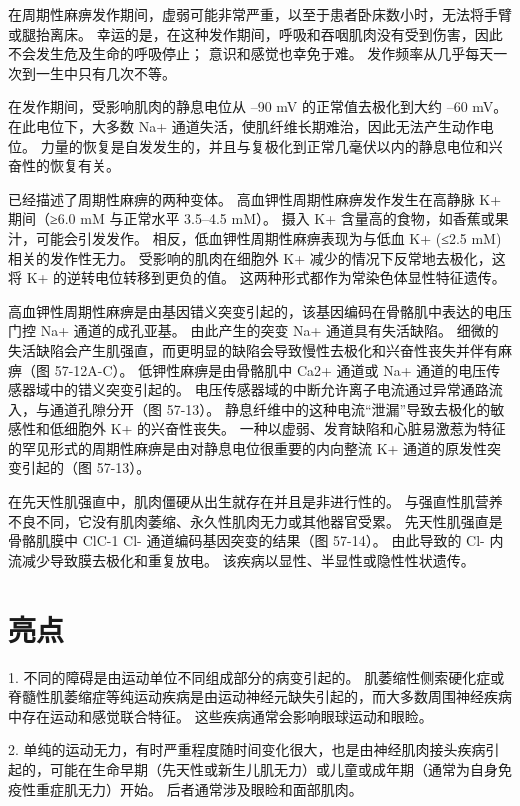在周期性麻痹发作期间，虚弱可能非常严重，以至于患者卧床数小时，无法将手臂或腿抬离床。 幸运的是，在这种发作期间，呼吸和吞咽肌肉没有受到伤害，因此不会发生危及生命的呼吸停止； 意识和感觉也幸免于难。 发作频率从几乎每天一次到一生中只有几次不等。

在发作期间，受影响肌肉的静息电位从 –90 mV 的正常值去极化到大约 –60 mV。 在此电位下，大多数 Na+ 通道失活，使肌纤维长期难治，因此无法产生动作电位。 力量的恢复是自发发生的，并且与复极化到正常几毫伏以内的静息电位和兴奋性的恢复有关。

已经描述了周期性麻痹的两种变体。 高血钾性周期性麻痹发作发生在高静脉 K+ 期间（≥6.0 mM 与正常水平 3.5–4.5 mM）。 摄入 K+ 含量高的食物，如香蕉或果汁，可能会引发发作。 相反，低血钾性周期性麻痹表现为与低血 K+ (≤2.5 mM) 相关的发作性无力。 受影响的肌肉在细胞外 K+ 减少的情况下反常地去极化，这将 K+ 的逆转电位转移到更负的值。 这两种形式都作为常染色体显性特征遗传。

高血钾性周期性麻痹是由基因错义突变引起的，该基因编码在骨骼肌中表达的电压门控 Na+ 通道的成孔亚基。 由此产生的突变 Na+ 通道具有失活缺陷。 细微的失活缺陷会产生肌强直，而更明显的缺陷会导致慢性去极化和兴奋性丧失并伴有麻痹（图 57-12A-C）。 低钾性麻痹是由骨骼肌中 Ca2+ 通道或 Na+ 通道的电压传感器域中的错义突变引起的。 电压传感器域的中断允许离子电流通过异常通路流入，与通道孔隙分开（图 57-13）。 静息纤维中的这种电流“泄漏”导致去极化的敏感性和低细胞外 K+ 的兴奋性丧失。 一种以虚弱、发育缺陷和心脏易激惹为特征的罕见形式的周期性麻痹是由对静息电位很重要的内向整流 K+ 通道的原发性突变引起的（图 57-13）。

在先天性肌强直中，肌肉僵硬从出生就存在并且是非进行性的。 与强直性肌营养不良不同，它没有肌肉萎缩、永久性肌肉无力或其他器官受累。 先天性肌强直是骨骼肌膜中 ClC-1 Cl- 通道编码基因突变的结果（图 57-14）。 由此导致的 Cl- 内流减少导致膜去极化和重复放电。 该疾病以显性、半显性或隐性性状遗传。

\section{亮点}

1. 不同的障碍是由运动单位不同组成部分的病变引起的。 肌萎缩性侧索硬化症或脊髓性肌萎缩症等纯运动疾病是由运动神经元缺失引起的，而大多数周围神经疾病中存在运动和感觉联合特征。 这些疾病通常会影响眼球运动和眼睑。 

2. 单纯的运动无力，有时严重程度随时间变化很大，也是由神经肌肉接头疾病引起的，可能在生命早期（先天性或新生儿肌无力）或儿童或成年期（通常为自身免疫性重症肌无力）开始。 后者通常涉及眼睑和面部肌肉。 

